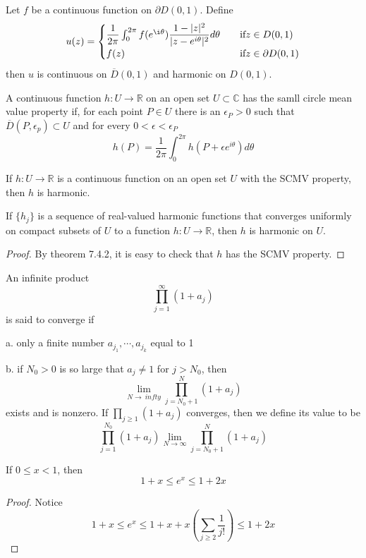 \documentclass[lang=en, color=blue, ]{elegantbook}
\newcommand{\R}{\mathbb{R}}
\newcommand{\C}{\mathbb{C}}
\begin{document}
\begin{theorem}
    Let $f$ be a continuous function on $\partial D(0,1)$. Define
    \[
    u(z) = \begin{cases}
        \dfrac{1}{2\pi} \int_0^{2\pi} f(e^{\i\theta})\dfrac{1-|z|^2}{|z-e^{i\theta}|^2}d\theta\quad&\text{if}z\in D(0,1)\\
        f(z)&\text{if}z\in\partial D(0,1)
    \end{cases}
    \]
    then $u$ is continuous on $\overline{D}(0,1)$ and harmonic on $D(0,1)$.
\end{theorem}

\begin{definition}
    A continuous function $h:U\to\R$ on an open set $U\subset \C$ has the samll circle mean value property if, for each point $P\in U$ there is an $\epsilon_P>0$ such that $\overline{D}(P,\epsilon_p)\subset U$ and for every $0<\epsilon <\epsilon_P$
    \[h(P) = \dfrac{1}{2\pi}\int_0^{2\pi}h(P+\epsilon e^{i\theta})d\theta\]
\end{definition}
\begin{theorem}
    If $h:U\to\R$ is a continuous function on an open set $U$ with the SCMV property, then $h$ is harmonic.
\end{theorem}

\begin{corollary}
    If $\{h_j\}$ is a sequence of real-valued harmonic functions that converges uniformly on compact subsets of $U$ to a function $h:U\to\R$, then $h$ is harmonic on $U$.
\end{corollary}
\begin{proof}
    By theorem 7.4.2, it is easy to check that $h$ has the SCMV property.
\end{proof}

\begin{definition}
    An infinite product
    \[
    \prod_{j=1}^{\infty} (1+a_j)
    \]
    is said to converge if\par
    a. only a finite number $a_{j_1},\cdots,a_{j_k}$ equal to 1\par
    b. if $N_0>0$ is so large that $a_j\neq 1$ for $j>N_0$, then
    \[
    \lim_{N\to\ infty} \prod_{j= N_0+1}^N (1+a_j)
    \]
    exists and is nonzero. If $\prod_{j\geq 1} (1+a_j)$ converges, then we define its value to be
    \[
    \prod_{j=1}^{N_0}(1+a_j) \lim_{N\to\infty}\prod_{j=N_0+1}^N (1+a_j)
    \]
\end{definition}

\begin{lemma}
    If $0\leq x < 1$, then
    \[1+x \leq e^x \leq 1+2x\]
\end{lemma}
\begin{proof}
    Notice
    \[1+x \leq e^x \leq 1+x+x(\sum\limits_{j\geq 2}\dfrac{1}{j!}) \leq 1+2x\]
\end{proof}
\end{document}
